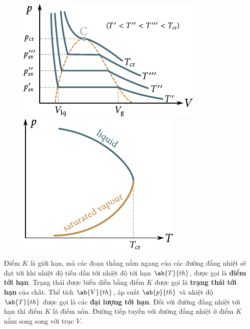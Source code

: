 \begin{figure}[!htb]
	\begin{minipage}[t]{0.5\linewidth}
		\begin{center}
			\includegraphics[scale=1]{figures/ch_15/fig_15_4.pdf}
			\caption[]{}
			\label{fig:15_4}
		\end{center}
	\end{minipage}
	\hspace{-0.05cm}
	\begin{minipage}[t]{0.5\linewidth}
		\begin{center}
			\includegraphics[scale=1]{figures/ch_15/fig_15_5.pdf}
			\caption[]{}
			\label{fig:15_5}
		\end{center}
	\end{minipage}
	\vspace{-0.4cm}
\end{figure}

Điểm $K$ là giới hạn, mà các đoạn thẳng nằm ngang của các đường đẳng nhiệt sẽ đạt tới khi nhiệt độ tiến dần tới nhiệt độ tới hạn $\ab{T}{th}$, được gọi là \textbf{điểm tới hạn}. Trạng thái được biểu diễn bằng điểm $K$ được gọi là \textbf{trạng thái tới hạn} của chất. Thể tích $\ab{V}{th}$, áp suất $\ab{p}{th}$ và nhiệt độ $\ab{T}{th}$ được gọi là các \textbf{đại lượng tới hạn}. Đối với đường đẳng nhiệt tới hạn thì điểm $K$ là điểm uốn. Đường tiếp tuyến với đường đẳng nhiệt ở điểm $K$ nằm song song với trục $V$.\\

